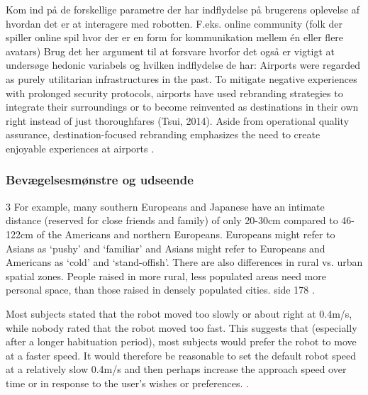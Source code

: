   












Kom ind på de forskellige parametre der har indflydelse på brugerens oplevelse af hvordan det er at interagere med robotten. F.eks. online community (folk der spiller online spil hvor der er en form for kommunikation mellem én eller flere avatars) \blankline
%
%
Brug det her argument til at forsvare hvorfor det også er vigtigt at undersøge hedonic variabels og hvilken indflydelse de har: Airports were regarded as purely utilitarian infrastructures in the past. To mitigate negative experiences with prolonged security protocols, airports have used rebranding strategies to integrate their surroundings or to become reinvented as destinations in their own right instead of just thoroughfares (Tsui, 2014). Aside from operational quality assurance, destination-focused rebranding emphasizes the need to create enjoyable experiences at airports \textcite[s. 352]{PDF:TheImpactOfTraveler}.\blankline
%

\subsubsection{Bevægelsesmønstre og udseende}
\label{InteraktionSocialeRobotterParametreBevaegelsesmoenstre}
%


3 For example, many southern Europeans and Japanese have an intimate distance (reserved for close friends and family) of only 20-30cm compared to 46-122cm of the Americans and northern Europeans. Europeans might refer to Asians as ‘pushy’ and ‘familiar’ and Asians might refer to Europeans and Americans as ‘cold’ and ‘stand-offish’. There are also differences in rural vs. urban spatial zones. People raised in more rural, less populated areas need more personal space, than those raised in densely populated cities. side 178 \textcite[s. 178]{PDF:HowMayIServeYou}.

Most subjects stated that the robot moved too slowly or about right at 0.4m/s, while nobody rated that the robot moved too fast. This suggests that (especially after a longer habituation period), most subjects would prefer the robot to move at a faster speed. It would therefore be reasonable to set the default robot speed at a relatively slow 0.4m/s and then perhaps increase the approach speed over time or in response to the user’s wishes or preferences. \textcite[s. 178]{PDF:HowMayIServeYou}. 

